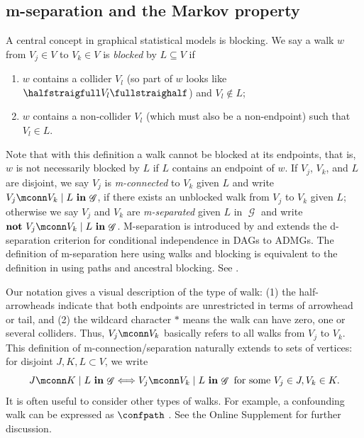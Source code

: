 \documentclass[12pt,a4paper]{article}
\theoremstyle{definition}
\newcommand{\indep}{\perp \!\!\! \perp}
\newcommand{\ingraph}[1]{~\textnormal{\bf in}\,#1}
\newcommand{\textnot}{\textnormal{\bf not}~}
\DeclareMathOperator{\gG}{\mathscr{G}}
\begin{document}
\subsection{m-separation and the Markov property}\label{subsec:m-separation}
A central concept in graphical statistical models is blocking. We say
a walk $w$ from $V_j \in V$ to $V_k \in V$ is \emph{blocked} by $L \subseteq V$ if
\begin{enumerate}
    \item $w$ contains a collider $V_l$ (so part of $w$ looks like
  $\halfstraigfull V_l \fullstraighalf$) and $V_l \not \in L$; 
    \item $w$ contains a non-collider $V_l$ (which must also be a
      non-endpoint) such that $V_l \in L$.
\end{enumerate}
Note that with this definition a walk cannot be blocked at its
endpoints, that is, $w$ is not necessarily blocked by $L$ if $L$
contains an endpoint of $w$. If $V_j$, $V_k$, and $L$ are disjoint, we
say $V_j$ is \emph{m-connected} to $V_k$ given $L$ and write $V_j
\mconn V_k \mid L \ingraph{\gG}$, if there exists an unblocked walk from $V_j$ to $V_k$ given $L$; otherwise we say $V_j$ and $V_k$ are \emph{m-separated} given $L$ in $\gG$ and write $\textnot V_j
\mconn V_k \mid L \ingraph{\gG}$. M-separation is introduced by
\textcite{richardson_markov_2003} and extends the
d-separation criterion for conditional independence in DAGs
\parencite{pearl1988book} to ADMGs. %
The definition of m-separation here using walks and blocking is
equivalent to the definition in  using paths and
ancestral blocking. See
\textcite{shachterBayesballRationalPastime1998,guo_confounder_2023}.

Our notation gives a visual description of the type of walk: (1) the
half-arrowheads indicate that both endpoints
are unrestricted in terms of arrowhead or tail, and (2) the wildcard
character $\ast$ means the walk can have zero, one or several
colliders. Thus, $V_j \mconn V_k$ basically refers to all
walks from $V_j$ to $V_k$. This definition of m-connection/separation
naturally extends to sets of vertices: for disjoint $J, K, L \subset
V$, we write
\[
  J \mconn K \mid L \ingraph{\gG} \Longleftrightarrow
  V_j \mconn V_k \mid L \ingraph{\gG}~\text{for some}~V_j \in
  J, V_k \in K.
\]
It is often useful to consider other types of walks. For example, a
confounding walk can be expressed as $\confpath$
\parencite{guo_confounder_2023}. See the Online Supplement for further
discussion.
\end{document}
